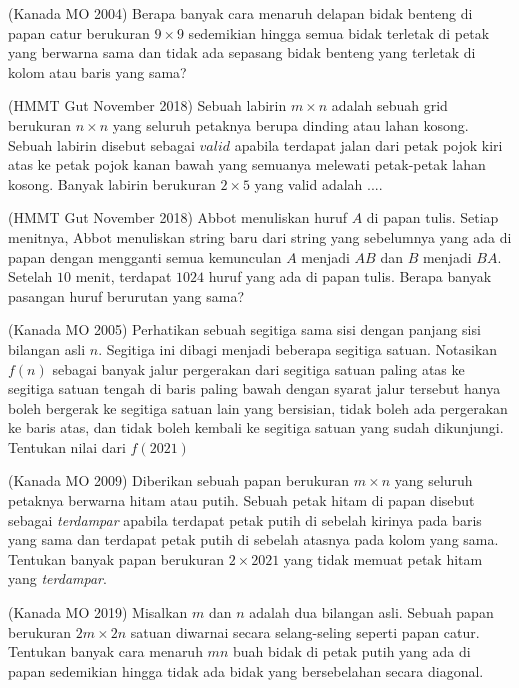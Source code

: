 \documentclass[11pt]{scrartcl}
\begin{document}
\begin{problem}
    (Kanada MO 2004) Berapa banyak cara menaruh delapan bidak benteng di papan catur berukuran $9 \times 9$ sedemikian hingga semua bidak terletak di petak yang berwarna sama dan tidak ada sepasang bidak benteng yang terletak di kolom atau baris yang sama?
\end{problem}

\begin{problem}
    (HMMT Gut November 2018) Sebuah labirin $m \times n$ adalah sebuah grid berukuran $n \times n$ yang seluruh petaknya berupa dinding atau lahan kosong. Sebuah labirin disebut sebagai $valid$ apabila terdapat jalan dari petak pojok kiri atas ke petak pojok kanan bawah yang semuanya melewati petak-petak lahan kosong. Banyak labirin berukuran $2\times 5$ yang valid adalah .... 
\end{problem}

\begin{problem}
    (HMMT Gut November 2018) Abbot menuliskan huruf $A$ di papan tulis. Setiap menitnya, Abbot menuliskan string baru dari string yang sebelumnya yang ada di papan dengan mengganti semua kemunculan $A$ menjadi $AB$ dan $B$ menjadi $BA$. Setelah $10$ menit, terdapat $1024$ huruf yang ada di papan tulis. Berapa banyak pasangan huruf berurutan yang sama?
\end{problem}

\begin{problem}
    (Kanada MO 2005) Perhatikan sebuah segitiga sama sisi dengan panjang sisi bilangan asli $n$. Segitiga ini dibagi menjadi beberapa segitiga satuan. Notasikan $f(n)$ sebagai banyak jalur pergerakan dari segitiga satuan paling atas ke segitiga satuan tengah di baris paling bawah dengan syarat jalur tersebut hanya boleh bergerak ke segitiga satuan lain yang bersisian, tidak boleh ada pergerakan ke baris atas, dan tidak boleh kembali ke segitiga satuan yang sudah dikunjungi. Tentukan nilai dari $f(2021)$
\end{problem}

\begin{problem}
    (Kanada MO 2009) Diberikan sebuah papan berukuran $m \times n$ yang seluruh petaknya berwarna hitam atau putih. Sebuah petak hitam di papan disebut sebagai \textit{terdampar} apabila terdapat petak putih di sebelah kirinya pada baris yang sama dan terdapat petak putih di sebelah atasnya pada kolom yang sama. Tentukan banyak papan berukuran $2\times 2021$ yang tidak memuat petak hitam yang \textit{terdampar}.
\end{problem}

\begin{problem}
    (Kanada MO 2019) Misalkan $m$ dan $n$ adalah dua bilangan asli. Sebuah papan berukuran $2m \times 2n$ satuan diwarnai secara selang-seling seperti papan catur. Tentukan banyak cara menaruh $mn$ buah bidak di petak putih yang ada di papan sedemikian hingga tidak ada bidak yang bersebelahan secara diagonal.  
\end{problem}
\end{document}

